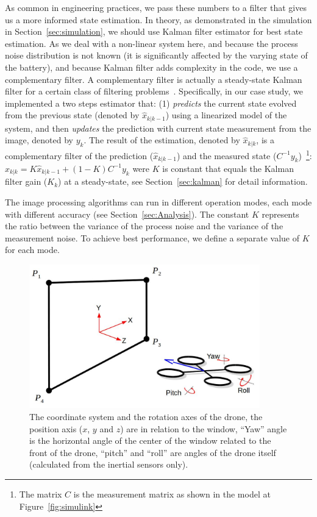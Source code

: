 \documentclass[ twoside, 12pt ]{article}
\begin{document}
As common in engineering practices, we pass these numbers to a filter that gives us a more informed state estimation. 
In theory, as demonstrated in the simulation in Section~\ref{sec:simulation}, we should use Kalman filter estimator for best state estimation. As we deal with a non-linear system here, and because the process noise distribution is not known (it is significantly affected by the varying state of the battery), and because Kalman filter adds complexity in the code, we use a complementary filter.
A complementary filter is actually a steady-state Kalman filter for a certain class of filtering problems~\cite{complementaryVSKalman}.
Specifically, in our case study, we implemented a two steps estimator that: (1) \textit{predicts} the current state evolved from the previous state (denoted by $\hat{x}_{k|k-1}$) using a linearized model of the system, and then \textit{updates} the prediction with current state measurement from the image, denoted by $y_k$.
The result of the estimation, denoted by $\hat{x}_{k|k}$, is a complementary filter of the prediction ($\hat{x}_{k|k-1}$) and the measured state ($C^{-1}y_k$)~\footnote{The matrix $C$ is the measurement matrix as shown in the model at Figure~\ref{fig:simulink}}:
$ \hat{x}_{k|k} = K \hat{x}_{k|k-1} + (1-K) C^{-1}y_k $ were $K$ is constant that equals the Kalman filter gain ($K_k$) at a steady-state, see Section~\ref{sec:kalman} for detail information.

The image processing algorithms can run in different operation modes, each mode with different accuracy (see Section~\ref{sec:Analysis}).
The constant $K$ represents the ratio between the variance of the process noise and the variance of the measurement noise. To achieve best performance, we define a separate value of $K$ for each mode.

\begin{figure} %
    \centerline{\includegraphics[width=100mm]{axis.jpg}}
    \caption{The coordinate system and the rotation axes of the drone, the position axis ($x$, $y$ and $z$) are in relation to the window, ``Yaw'' angle is the horizontal angle of the center of the window related to the front of the drone, ``pitch'' and ``roll'' are angles of the drone itself (calculated from the inertial sensors only).}
    \label{fig:axis}
\end{figure}
\end{document}

